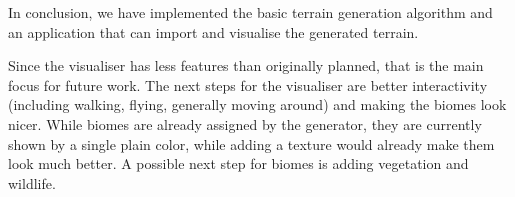 
In conclusion, we have implemented the basic terrain generation algorithm and an application that can import and visualise the generated terrain.

Since the visualiser has less features than originally planned, that is the main focus for future work.
The next steps for the visualiser are better interactivity (including walking, flying, generally moving around) and making the biomes look nicer.
While biomes are already assigned by the generator, they are currently shown by a single plain color, while adding a texture would already make them look much better.
A possible next step for biomes is adding vegetation and wildlife.
